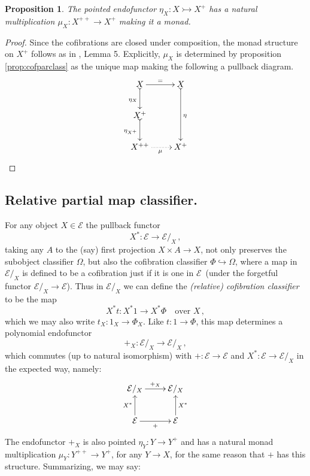 \documentclass[11pt,reqno]{amsart}
\newcommand{\EE}{\ensuremath{\mathcal{E}}}
\newcommand{\hook}{\ensuremath{\hookrightarrow}}
\newcommand{\mono}{\ensuremath{\rightarrowtail}}
\newcommand{\ra}{\ensuremath{\rightarrow}}
\renewcommand{\to}{\ensuremath{\rightarrow}}
\newcommand{\too}{\ensuremath{\longrightarrow}}
\newtheorem{proposition}[theorem]{Proposition}
\theoremstyle{remark}
\theoremstyle{definition}
\begin{document}

\begin{proposition}\label{prop:plusmonad}
The pointed endofunctor  $\eta_X : X\mono X^+$ has a natural multiplication $\mu_X : X^{++} \ra X^+$ making it a monad.
\end{proposition}

\begin{proof}
Since the cofibrations are closed under composition, the monad structure on $X^+$ follows as in \cite{A:natural}, Lemma 5.  Explicitly, $\mu_X$ is determined by proposition \ref{prop:cofparclass} as the unique map making the following a pullback diagram.
\[
\xymatrix{
X \ar@{>->}[d]_{\eta_X} \ar[r]^= & X \ar@{>->}[dd]^{\eta}\\
X^+ \ar@{>->}[d]_{\eta_{X^+}} & \\
X^{++} \ar@{.>}[r]_\mu & X^+
}
\]
\end{proof}

\subsection*{Relative partial map classifier.}

For any object $X\in\EE$ the pullback functor 
\[
X^* : \EE \ra \EE/_X\,,
\]
taking any $A$ to the (say) first projection $X\times A \ra X$, not only preserves the subobject classifier $\Omega$, but also the cofibration classifier $\Phi \hook \Omega$, where a map in $\EE/_X$ is defined to be a cofibration just if it is one in \EE\ (under the forgetful functor $\EE/_X \to \EE$). Thus in $\EE/_X$ we can define the \emph{(relative) cofibration classifier} to be the map
\[
X^*t : X^*1 \too X^*\Phi	\quad\text{over $X$}\,,
\]
which we may also write $t_X : 1_X \ra \Phi_X$.  Like $t : 1\ra \Phi$, this map determines a polynomial endofunctor  
\[
+_X : \EE/_X \ra \EE/_X\,,
\]
 which commutes (up to natural isomorphism) with $+ : \EE \ra \EE$ and $X^* : \EE \ra \EE/_X$ in the expected way, namely:
\begin{equation}\label{diag:+fibered}
\xymatrix{
\EE/_X \ar[r]^{+_X}& \EE/_X \\
\EE \ar[u]^{X^*} \ar[r]_+ & \ar[u]_{X^*}\EE 
}
\end{equation}
The endofunctor $+_X$ is also pointed $\eta_Y : Y \ra Y^+$ and has a natural monad multiplication $\mu_Y : Y^{++} \ra Y^+$, for any $Y\ra X$, for the same reason that $+$ has this structure.  Summarizing, we may say:
\end{document}
